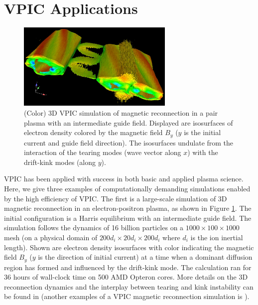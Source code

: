 \documentclass[aps,prl,preprint,preprintnumbers,groupedaddress]{revtex4}
\newcommand{\fig}[1]{Figure \ref{fig:#1}}
\begin{document}
\section{VPIC Applications}

\begin{figure}
\centering
\includegraphics[width=75mm]{magnetic_reconnection.eps}
\caption{\label{fig:magnetic_reconnection}
(Color) 3D VPIC simulation of magnetic reconnection in a pair plasma
with an intermediate guide field.  Displayed are isosurfaces of
electron density colored by the magnetic field $B_y$ ($y$ is the
initial current and guide field direction).  The isosurfaces undulate
from the interaction of the tearing modes (wave vector along $x$) with
the drift-kink modes (along $y$). \cite{Yin_et_al_PRL_2007_reconnection}}
\end{figure}

VPIC has been applied with success in both basic and applied plasma
science.  Here, we give three examples of computationally demanding
simulations enabled by the high efficiency of VPIC.  The first is a
large-scale simulation of 3D magnetic reconnection in an
electron-positron plasma, as shown in \fig{magnetic_reconnection}.
The initial configuration is a Harris equilibrium with an intermediate
guide field.  The simulation follows the dynamics of 16 billion
particles on a $1000\times100\times1000$ mesh (on a physical domain of
$200d_i\times20d_i\times200d_i$ where $d_i$ is the ion inertial
length).  Shown are electron density isosurfaces with color indicating
the magnetic field $B_y$ ($y$ is the direction of initial current) at
a time when a dominant diffusion region has formed and influenced by
the drift-kink mode.  The calculation ran for 36 hours of wall-clock
time on 500 AMD Opteron cores. More details on the 3D reconnection
dynamics and the interplay between tearing and kink instability can be
found in \cite{Yin_et_al_PRL_2007_reconnection} (another examples of a
VPIC magnetic reconnection simulation is \cite{Bowers_Li_PRL_2007}).
\end{document}
